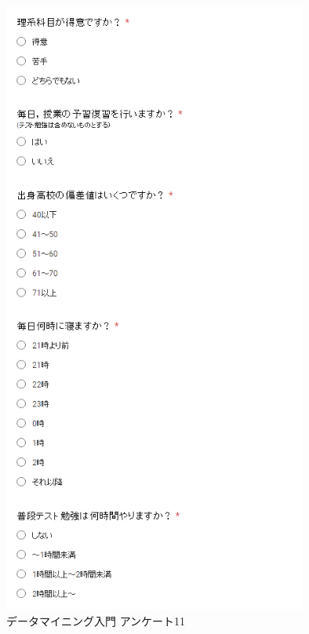 \begin{figure}[p]
\centering
\includegraphics[width=10cm]{forms14.PNG}
\caption{データマイニング入門 アンケート11}\label{サンプル図}
\end{figure}

